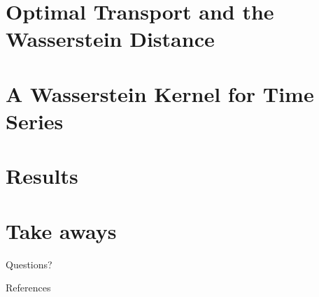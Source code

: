 \documentclass[10pt]{beamer}
\begin{document}
\section{Optimal Transport and the Wasserstein Distance}

\section{A Wasserstein Kernel for Time Series}


\section{Results}


\section{Take aways}



\begin{frame}[standout]
  Questions?
\end{frame}

\begin{frame}[allowframebreaks]{References}

  
  

\end{frame}

\appendix
\end{document}
